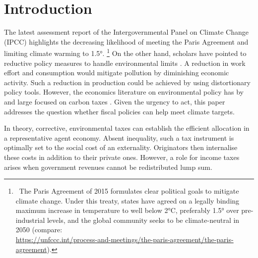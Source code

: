 \section{Introduction}

The latest assessment report of the Intergovernmental Panel on Climate Change (IPCC) \citep{IPCC2022} highlights the decreasing likelihood of meeting the Paris Agreement and limiting climate warming to 1.5°.%
\footnote{ \ The Paris Agreement of 2015 formulates clear political goals to mitigate climate change. Under this treaty, states have agreed on a legally binding maximum increase in temperature to well below 2°C, preferably 1.5° over pre-industrial levels, and the global community seeks to be climate-neutral in 2050  (compare:\\ \url{https://unfccc.int/process-and-meetings/the-paris-agreement/the-paris-agreement}). 
}
On the other hand, scholars have pointed to reductive policy measures to handle environmental limits \citep{Arrow2004AreMuch, Schor2005SustainableReduction, Dasgupta2021}. A reduction in work effort and consumption would mitigate pollution by diminishing economic activity. Such a reduction in production could be achieved by using distortionary policy tools.
However, the economics literature on environmental policy has by and large focused on carbon taxes \citep{Golosov2014OptimalEquilibrium, Barrage2019OptimalPolicy}. %
Given the urgency to act, this paper addresses the question whether fiscal policies can help meet climate targets.

In theory, corrective, environmental taxes can establish the efficient allocation in a representative agent economy. Absent inequality, such a tax instrument is optimally set to the social cost of an externality. Originators then internalise these costs in addition to their private ones. However, a role for income taxes arises when government revenues cannot be redistributed lump sum.

